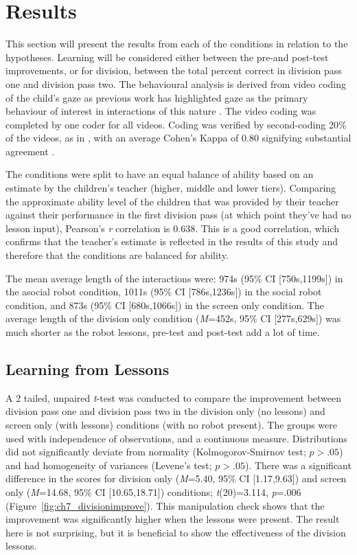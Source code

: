 \section{Results}\label{sec:social-results}
This section will present the results from each of the conditions in relation to the hypotheses. Learning will be considered either between the pre-and post-test improvements, or for division, between the total percent correct in division pass one and division pass two. The behavioural analysis is derived from video coding of the child's gaze as previous work has highlighted gaze as the primary behaviour of interest in interactions of this nature \citep{kennedy2015comparing}. The video coding was completed by one coder for all videos. Coding was verified by second-coding 20\% of the videos, as in \cite{moshkina2014social}, with an average Cohen's Kappa of 0.80 signifying substantial agreement \citep{landis1977measurement}.

The conditions were split to have an equal balance of ability based on an estimate by the children's teacher (higher, middle and lower tiers). Comparing the approximate ability level of the children that was provided by their teacher against their performance in the first division pass (at which point they've had no lesson input), Pearson's \textit{r} correlation is 0.638. This is a good correlation, which confirms that the teacher's estimate is reflected in the results of this study and therefore that the conditions are balanced for ability.

The mean average length of the interactions were: 974s (95\% CI [750s,1199s]) in the asocial robot condition, 1011s (95\% CI [786s,1236s]) in the social robot condition, and 873s (95\% CI [680s,1066s]) in the screen only condition. The average length of the division only condition (\textit{M}=452s, 95\% CI [277s,629s]) was much shorter as the robot lessons, pre-test and post-test add a lot of time.

\subsection{Learning from Lessons}\label{sec:socasoc-results-division}
A 2 tailed, unpaired \textit{t}-test was conducted to compare the improvement between division pass one and division pass two in the division only (no lessons) and screen only (with lessons) conditions (with no robot present). The groups were used with independence of observations, and a continuous measure. Distributions did not significantly deviate from normality (Kolmogorov-Smirnov test; $\textit{p}>.05$) and had homogeneity of variances (Levene's test; $\textit{p}>.05$). There was a significant difference in the scores for division only (\textit{M}=5.40, 95\% CI [1.17,9.63]) and screen only (\textit{M}=14.68, 95\% CI [10.65,18.71]) conditions; \textit{t}(20)=3.114, \textit{p}=.006 (Figure~\ref{fig:ch7_divisionimprove}). This manipulation check shows that the improvement was significantly higher when the lessons were present. The result here is not surprising, but it is beneficial to show the effectiveness of the division lessons.

